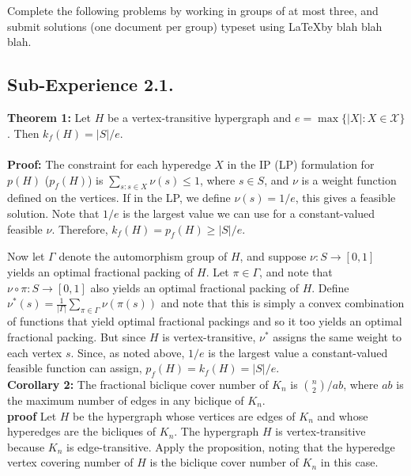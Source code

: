 \documentclass[10pt, AMS Euler]{article}
\begin{document}
	
	
	\\
     \\
	
	 Complete the following problems by working in groups of at most three, and submit solutions (one document per group) typeset using \LaTeX by blah blah blah.\\


\subsection*{Sub-Experience 2.1.}
\textbf{Theorem 1: }
    Let $H$ be a vertex-transitive hypergraph and $e = \max\{|X| : X \in \mathcal{X}\}$. Then $k_f(H) = |S|/e$. \\\\

\textbf{Proof: }
    The constraint for each hyperedge $X$ in the IP (LP) formulation for $p(H)$ ($p_f(H)$) is $\sum_{s : s \in X} \nu(s) \leq 1$, where $s \in S$, and $\nu$ is a weight function defined on the vertices. If in the LP, we define $\nu(s) = 1/e$, this gives a feasible solution. Note that $1/e$ is the largest value we can use for a constant-valued feasible $\nu$. Therefore, $k_f(H) = p_f(H) \geq |S|/e$. 
    
    Now let $\Gamma$ denote the automorphism group of $H$, and suppose $\nu : S \rightarrow [0, 1]$ yields an optimal fractional packing of $H$. Let $\pi \in \Gamma$, and note that $\nu \circ \pi : S \rightarrow [0, 1]$ also yields an optimal fractional packing of $H$. Define $\nu^*(s) = \frac{1}{|\Gamma|} \sum_{\pi \in \Gamma} \nu(\pi(s))$ and note that this is simply a convex combination of functions that yield optimal fractional packings and so it too yields an optimal fractional packing. But since $H$ is vertex-transitive, $\nu^*$ assigns the same weight to each vertex $s$. Since, as noted above, $1/e$ is the largest value a constant-valued feasible function can assign, $p_f(H) = k_f(H) = |S|/e$. \\

\textbf{Corollary 2: }
The fractional biclique cover number of $K_n$ is $\binom{n}{2}/ab$, where $ab$ is the maximum number of edges in any biclique of $K_n$. \\

\textbf{proof}
    Let $H$ be the hypergraph whose vertices are edges of $K_n$ and whose hyperedges are the bicliques of $K_n$. The hypergraph $H$ is vertex-transitive because $K_n$ is edge-transitive. Apply the proposition, noting that the hyperedge vertex covering number of $H$ is the biclique cover number of $K_n$ in this case. \\
\end{document}
